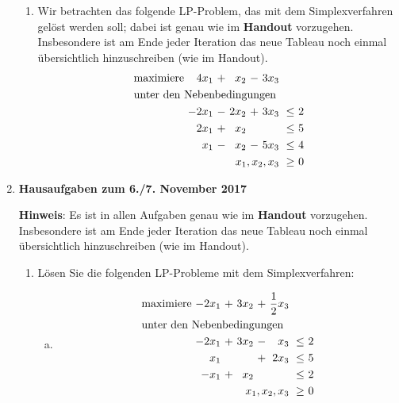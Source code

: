 \documentclass[11pt, a4paper]{article}
\begin{document}
\begin{enumerate}[\bfseries A:]
\begin{enumerate}[\bfseries 1.]
\item Wir betrachten das folgende LP-Problem, das mit dem Simplexverfahren gelöst werden soll; dabei ist genau wie im \textbf{Handout} vorzugehen. Insbesondere ist am Ende jeder Iteration das neue Tableau noch einmal übersichtlich hinzuschreiben (wie im Handout).
\begin{align*}
\begin{alignedat}{5}
& \text{maximiere } & 4x_1 &\ + &\ x_2 &\ - &\ 3x_3 & & \\
& \rlap{unter den Nebenbedingungen} & & & & & & & \\
&& -2x_1 &\ - &\ 2x_2 &\ + &\ 3x_3 &\ \leq &\ 2 \\
&&  2x_1 &\ + &\  x_2 &\   &\      &\ \leq &\ 5 \\
&&   x_1 &\ - &\  x_2 &\ - &\ 5x_3 &\ \leq &\ 4 \\
&&&&&& \llap{$x_1,x_2,x_3$} &\ \geq &\ 0
\end{alignedat}
\end{align*}

\end{enumerate}


\item \textbf{Hausaufgaben zum 6./7. November 2017}

\textbf{Hinweis}: Es ist in allen Aufgaben genau wie im \textbf{Handout} vorzugehen. Insbesondere ist am Ende jeder Iteration das neue Tableau noch einmal übersichtlich hinzuschreiben (wie im Handout).

\begin{enumerate}[\bfseries 1.]

\item Lösen Sie die folgenden LP-Probleme mit dem Simplexverfahren:
\begin{enumerate}[a)]

\item \begin{align*}
\begin{alignedat}{6}
& \text{maximiere } & -2x_1 &\ + &\ 3x_2 &\ + &\ \frac{1}{2}x_3 & & \\
& \rlap{unter den Nebenbedingungen} & & & & & & & \\
&& -2x_1 &\ + &\ 3x_2 &\ - &\  x_3 &\ \leq &\ 2 \\
&&   x_1 &    &       &\ + &\ 2x_3 &\ \leq &\ 5 \\
&&  -x_1 &\ + &\  x_2 &    &       &\ \leq &\ 2 \\
&& & & & & \llap{$x_1, x_2, x_3$} &\ \geq &\ 0 
\end{alignedat}
\end{align*}


\end{enumerate}
\end{enumerate}
\end{enumerate}
\end{document}

